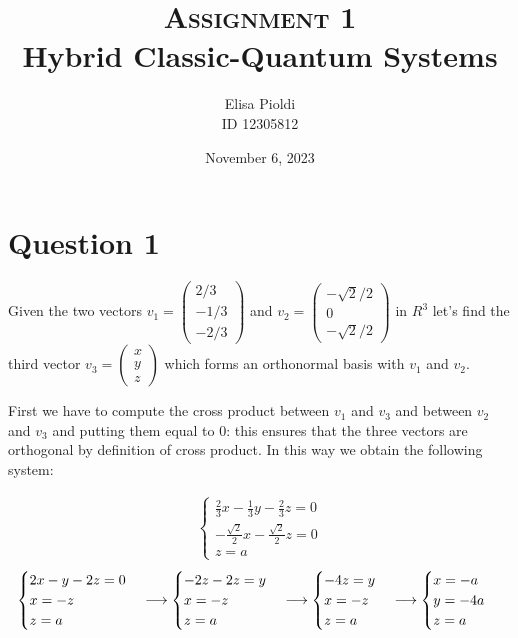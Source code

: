 \documentclass[12pt]{article}
\title{\textbf{\textsc{Assignment 1}}\\Hybrid Classic-Quantum Systems}
\author{Elisa Pioldi\\
        ID 12305812}
\date{November 6, 2023}
\begin{document}
\maketitle
\maketitle

\section*{Question 1}

Given the two vectors 
$v_1 =
\begin{pmatrix}
    2/3 \\ -1/3 \\ -2/3
\end{pmatrix}
$
and 
$ 
v_2 =
\begin{pmatrix}
    -\sqrt{2}/2 \\ 0 \\ -\sqrt{2}/2
\end{pmatrix}
$
in $R^3$ let's find the third vector 
$v_3
= 
\begin{pmatrix}
    x \\
    y \\
    z
\end{pmatrix}
$
which forms an orthonormal basis with $v_1$ and $v_2$.

First we have to compute the cross product between $v_1$ and $v_3$ and between 
$v_2$ and $v_3$ and putting them equal to 0: this ensures that the three vectors 
are orthogonal by definition of cross product. In this way we obtain the following 
system:

\begin{gather*}
\begin{cases}
    \frac{2}{3}x -\frac{1}{3} y -\frac{2}{3} z = 0 \\
    -\frac{\sqrt{2}}{2} x -\frac{\sqrt{2}}{2} z = 0 \\
    z = a
\end{cases}
\end{gather*}
\[
\begin{cases}
    2x -y -2 z = 0 \\
    x = -z \\
    z = a
\end{cases} 
\longrightarrow
\begin{cases}
    -2z -2 z = y \\
    x = -z \\
    z = a
\end{cases} 
\longrightarrow
\begin{cases}
    -4 z = y \\
    x = -z \\
    z = a
\end{cases}
\longrightarrow
\begin{cases}
    x = -a \\
    y = -4a \\
    z = a
\end{cases} \\
\]
\end{document}
